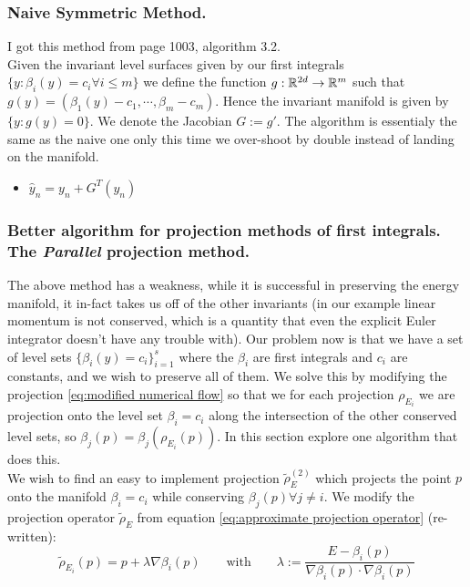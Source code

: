 \documentclass[12pt]{article}
\begin{document}
\subsubsection{Naive Symmetric Method.}
I got this method from \cite{hairer2002geometric} page 1003, algorithm 3.2. \\

Given the invariant level surfaces given by our first integrals $\{y:\beta_i(y) = c_i \forall i \leq m\}$ we define the function $g : \mathbb{R}^{2d}\to\mathbb{R}^m$ such that $g(y) = (\beta_1(y) - c_1 , \cdots , \beta_m - c_m)$. Hence the invariant manifold is given by $\{y : g(y)=0\}$. We denote the Jacobian $G := g'$. The algorithm \cite{hairer2002geometric} is essentialy the same as the naive one only this time we over-shoot by double instead of landing on the manifold. 
\begin{itemize}
    \item $\hat y_n = y_n + G^T(y_n)$ 
\end{itemize}


\subsubsection{Better algorithm for projection methods of first integrals. The \textit{Parallel} projection method.}

The above method has a weakness, while it is successful in preserving the energy manifold, it in-fact takes us off of the other invariants (in our example linear momentum is not conserved, which is a quantity that even the explicit Euler integrator doesn't have any trouble with). Our problem now is that we have a set of level sets $\{\beta_i(y) = c_i\}^s_{i=1}$ where the $\beta_i$ are first integrals and $c_i$ are constants, and we wish to preserve all of them. We solve this by modifying the projection \eqref{eq:modified numerical flow} so that we for each projection $\rho_{E_i}$ we are projection onto the level set $\beta_i=c_i$ along the intersection of the other conserved level sets, so $\beta_j(p) = \beta_j(\rho_{E_i}(p))$. In this section explore one algorithm that does this. \\

We wish to find an easy to implement projection $\widetilde \rho_E^{(2)}$ which projects the point $p$ onto the manifold $\beta_i=c_i$ while conserving $\beta_j(p)\forall j\neq i$. We modify the projection operator $\widetilde \rho_E$ from equation \eqref{eq:approximate projection operator} (re-written):
$$
\widetilde \rho_{E_i}(p) = p + \lambda \nabla \beta_i(p)\qquad \text{with}\qquad \lambda := \frac{E - \beta_i(p)}{\nabla \beta_i(p) \cdot \nabla \beta_i(p)}
$$
\end{document}
